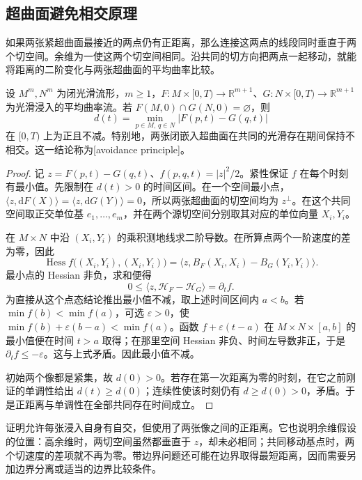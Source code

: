 \subsection{超曲面避免相交原理}
\label{g3:subsec:2802:02}
如果两张紧超曲面最接近的两点仍有正距离，那么连接这两点的线段同时垂直于两个切空间。余维为一使这两个切空间相同。沿共同的切方向把两点一起移动，就能将距离的二阶变化与两张超曲面的平均曲率比较。

\begin{theorem}\label{g3:thm:mcf-avoidance}
	设 \(M^m,N^m\) 为闭光滑流形，\(m\ge1\)，\(F:M\times[0,T)\to\mathbb R^{m+1}\)、\(G:N\times[0,T)\to\mathbb R^{m+1}\) 为光滑浸入的平均曲率流。若 \(F(M,0)\cap G(N,0)=\varnothing\)，则
	\[
		d(t)=\min_{p\in M,\,q\in N}|F(p,t)-G(q,t)|
	\]
	在 \([0,T)\) 上为正且不减。特别地，两张闭嵌入超曲面在共同的光滑存在期间保持不相交。这一结论称为[avoidance principle]。
\end{theorem}
\begin{proof}
	记 \(z=F(p,t)-G(q,t)\)、\(f(p,q,t)=|z|^2/2\)。紧性保证 \(f\) 在每个时刻有最小值。先限制在 \(d(t)>0\) 的时间区间。在一个空间最小点，\(\langle z,\mathrm dF(X)\rangle=\langle z,\mathrm dG(Y)\rangle=0\)，所以两张超曲面的切空间均为 \(z^\perp\)。在这个共同空间取正交单位基 \(e_1,\ldots,e_m\)，并在两个源切空间分别取其对应的单位向量 \(X_i,Y_i\)。

	在 \(M\times N\) 中沿 \((X_i,Y_i)\) 的乘积测地线求二阶导数。在所算点两个一阶速度的差为零，因此
	\[
		\operatorname{Hess}f\bigl((X_i,Y_i),(X_i,Y_i)\bigr)
		=\langle z,B_F(X_i,X_i)-B_G(Y_i,Y_i)\rangle.
	\]
	最小点的 Hessian 非负，求和便得
	\[
		0\le\langle z,\mathcal H_F-\mathcal H_G\rangle
		=\partial_t f.
	\]
	为直接从这个点态结论推出最小值不减，取上述时间区间内 \(a<b\)。若 \(\min f(b)<\min f(a)\)，可选 \(\varepsilon>0\)，使 \(\min f(b)+\varepsilon(b-a)<\min f(a)\)。函数 \(f+\varepsilon(t-a)\) 在 \(M\times N\times[a,b]\) 的最小值便在时间 \(t>a\) 取得；在那里空间 Hessian 非负、时间左导数非正，于是 \(\partial_tf\le-\varepsilon\)。这与上式矛盾。因此最小值不减。

	初始两个像都是紧集，故 \(d(0)>0\)。若存在第一次距离为零的时刻，在它之前刚证的单调性给出 \(d(t)\ge d(0)\)；连续性使该时刻仍有 \(d\ge d(0)>0\)，矛盾。于是正距离与单调性在全部共同存在时间成立。
\end{proof}

证明允许每张浸入自身有自交，但使用了两张像之间的正距离。它也说明余维假设的位置：高余维时，两切空间虽然都垂直于 \(z\)，却未必相同；共同移动基点时，两个切速度的差项就不再为零。带边界问题还可能在边界取得最短距离，因而需要另加边界分离或适当的边界比较条件。

